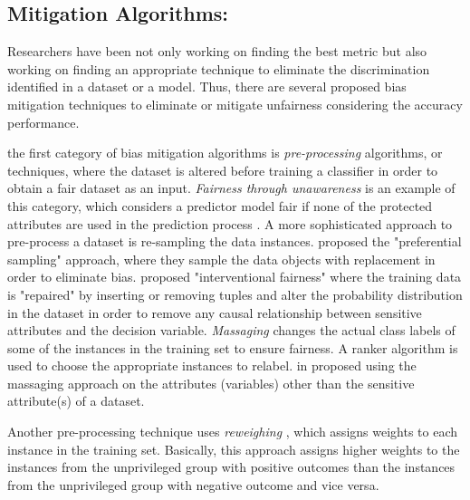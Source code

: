 \subsection{Mitigation Algorithms:}
Researchers have been not only working on finding the best metric but also working on finding an appropriate technique to eliminate the discrimination identified in a dataset or a model. Thus, there are several proposed bias mitigation techniques to eliminate or mitigate unfairness considering the accuracy performance.

 the first category of bias mitigation algorithms is \emph{pre-processing} algorithms, or techniques, where the dataset is altered before training a classifier in order to obtain a fair dataset as an input. \emph{Fairness through unawareness} is an example of this category, which considers a predictor model fair if none of the protected attributes are used in the prediction process \cite{gajane2017formalizing}. A more sophisticated approach to pre-process a dataset is re-sampling the data instances. \citeauthor{kamiran2010preferential_samp} \cite{kamiran2010preferential_samp} proposed the "preferential sampling" approach, where they sample the data objects with replacement in order to eliminate bias.  
\citeauthor{salimi2019capuchin} \cite{salimi2019capuchin} proposed "interventional fairness" where the training data is "repaired" by inserting or removing tuples and alter the probability distribution in the dataset in order to remove any causal relationship between sensitive attributes and the decision variable. 
\emph{Massaging} \cite{kamiran2012data-preproc} changes the actual class labels of some of the instances in the training set to ensure fairness. A ranker algorithm is used to choose the appropriate instances to relabel.
\citeauthor{feldman2015certifying} in \cite{feldman2015certifying} proposed using the massaging approach on the attributes (variables) other than the sensitive attribute(s) of a dataset. 

Another pre-processing technique uses \emph{reweighing} \cite{calders2009reweighing}, which assigns weights to each instance in the training set. Basically, this approach assigns higher weights to the instances from the unprivileged group with positive outcomes than the instances from the unprivileged group with negative outcome and vice versa. 

